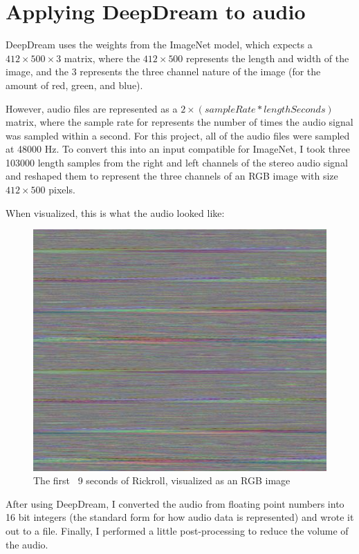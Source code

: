 \documentclass[11pt]{article}
\begin{document}
\section{Applying DeepDream to audio}
DeepDream uses the weights from the ImageNet model, which expects a $412 \times 500 \times 3$ matrix, where the $412 \times 500$ represents the length and width
of the image, and the 3 represents the three channel nature of the image (for the amount of red, green, and blue).

However, audio files are represented as a $2 \times (sampleRate * lengthSeconds)$ matrix, where the sample rate for represents the number of times the audio signal was sampled
within a second. For this project, all of the audio files were sampled at 48000 Hz. To convert this into an input compatible for ImageNet, I took three 103000 length samples from
the right and left channels of the stereo audio signal and reshaped them to represent the three channels of an RGB image with size $412 \times 500$ pixels.

When visualized, this is what the audio looked like:
\begin{figure}[!htb]
    \includegraphics[width=\linewidth]{visualizations/rickroll/0.jpg}
    \caption{The first ~9 seconds of Rickroll, visualized as an RGB image}
    \label{fig:rickroll}
\end{figure}
\FloatBarrier
After using DeepDream, I converted the audio from floating point numbers into 16 bit integers (the standard form for how audio data is represented) and wrote it out to a file.
Finally, I performed a little post-processing to reduce the volume of the audio.
\end{document}

